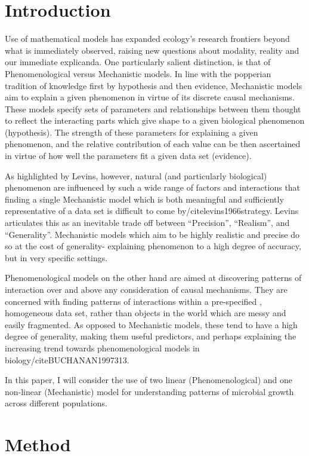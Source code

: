 \documentclass{article}
\begin{document}
    \section{Introduction}
Use of mathematical models has expanded ecology’s research frontiers beyond what is immediately observed, raising new questions about modality, reality and our immediate explicanda. One particularly salient distinction, is that of Phenomenological versus Mechanistic models. In line with the popperian tradition of knowledge first by hypothesis and then evidence, Mechanistic models aim to explain a given phenomenon in virtue of its discrete causal mechanisms. These models specify sets of parameters and relationships between them thought to reflect the interacting parts which give shape to a given biological phenomenon (hypothesis). The strength of these parameters for explaining a given phenomenon, and the relative contribution of each value can be then ascertained in virtue of how well the parameters fit a given data set (evidence).  

As highlighted by Levins, however, natural (and particularly biological) phenomenon are influenced by such a wide range of factors and interactions  that finding a single Mechanistic model which is both meaningful and sufficiently representative of a data set is difficult to come by/cite{levins1966strategy}. Levins articulates this as an inevitable trade off between “Precision”, “Realism”, and “Generality”. Mechanistic models which aim to be highly realistic and precise do so at the cost of generality- explaining phenomenon to a high degree of accuracy, but in very specific settings. 

Phenomenological models on the other hand are aimed at discovering patterns of interaction over and above any consideration of causal mechanisms. They are concerned with finding  patterns of interactions within a pre-specified , homogeneous data set, rather than objects in the world which are messy and  easily fragmented.  As opposed to Mechanistic models, these tend to have a high degree of generality, making them useful predictors, and perhaps explaining the increasing trend towards phenomenological models in biology/cite{BUCHANAN1997313}. 
 
In this paper, I will consider the use of two linear (Phenomenological) and one non-linear (Mechanistic) model for understanding patterns of microbial growth across different populations. 

    \section{Method}
\end{document}
